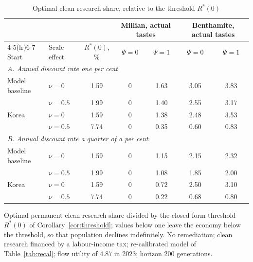 \documentclass[11pt]{article}
\begin{document}
\begin{table}[h!]\centering
\begin{threeparttable}
\caption{Optimal clean-research share, relative to the threshold $R^\ast(0)$}
\label{tab:welfare_R}
\footnotesize
\begin{tabular}{llccccc}
\toprule
 & & & \multicolumn{2}{c}{Millian, actual tastes} & \multicolumn{2}{c}{Benthamite, actual tastes}\\
\cmidrule(lr){4-5}\cmidrule(lr){6-7}
Start & Scale effect & $R^\ast(0)$, \% & $\Psi=0$ & $\Psi=1$ & $\Psi=0$ & $\Psi=1$\\
\midrule
\multicolumn{7}{l}{\emph{A. Annual discount rate one per cent}}\\
Model baseline & $\nu=0$   & 1.59 & 0 & 1.63 & 3.05 & 3.83\\
               & $\nu=0.5$ & 1.99 & 0 & 1.40 & 2.55 & 3.17\\
Korea          & $\nu=0$   & 1.59 & 0 & 1.38 & 2.48 & 3.53\\
               & $\nu=0.5$ & 7.74 & 0 & 0.35 & 0.60 & 0.83\\
\midrule
\multicolumn{7}{l}{\emph{B. Annual discount rate a quarter of a per cent}}\\
Model baseline & $\nu=0$   & 1.59 & 0 & 1.15 & 2.15 & 2.32\\
               & $\nu=0.5$ & 1.99 & 0 & 1.08 & 1.85 & 2.00\\
Korea          & $\nu=0$   & 1.59 & 0 & 0.72 & 2.50 & 3.10\\
               & $\nu=0.5$ & 7.74 & 0 & 0.22 & 0.68 & 0.80\\
\bottomrule
\end{tabular}
\begin{tablenotes}\footnotesize
\item Optimal permanent clean-research share divided by the closed-form threshold $R^\ast(0)$ of
Corollary~\ref{cor:threshold}; values below one leave the economy below the threshold, so that population
declines indefinitely. No remediation; clean research financed by a labour-income tax; re-calibrated model
of Table~\ref{tab:recal}; flow utility of $4.87$ in 2023; horizon 200 generations.
\end{tablenotes}
\end{threeparttable}
\end{table}
\end{document}
